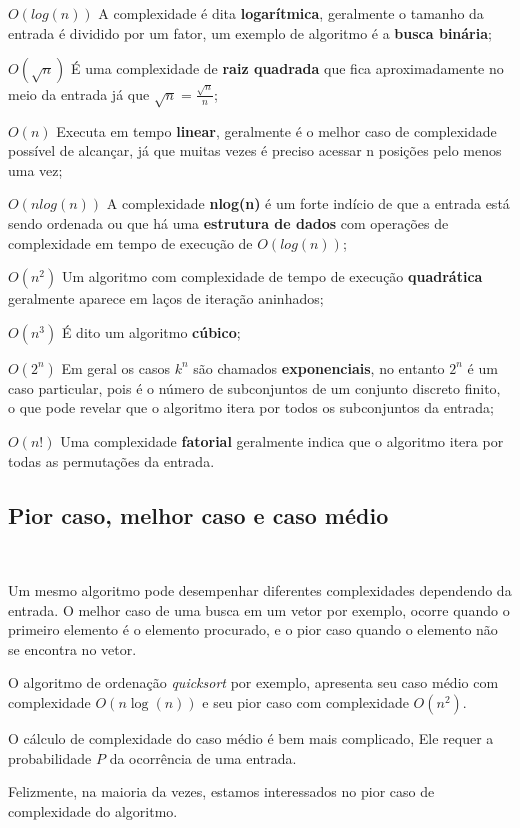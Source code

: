 $O(log(n))$ A complexidade é dita \textbf{logarítmica}, geralmente o tamanho da entrada é dividido por um fator, um exemplo de algoritmo é a \textbf{busca binária};

$O(\sqrt{n})$ É uma complexidade de \textbf{raiz quadrada} que fica aproximadamente no meio da entrada já que $\sqrt{n} = \frac{\sqrt{n}}{n}$;

$O(n)$ Executa em tempo \textbf{linear}, geralmente é o melhor caso de complexidade possível de alcançar, já que muitas vezes é preciso acessar n posições pelo menos uma vez;

$O(nlog(n))$ A complexidade \textbf{nlog(n)} é um forte indício de que a entrada está sendo ordenada ou que há uma \textbf{estrutura de dados} com operações de complexidade em tempo de execução de $O(log(n))$;

$O(n^2)$ Um algoritmo com complexidade de tempo de execução \textbf{quadrática} geralmente aparece em laços de iteração aninhados; 

$O(n^3)$ É dito um algoritmo \textbf{cúbico};

$O(2^n)$ Em geral os casos $k^n$ são chamados \textbf{exponenciais}, no entanto $2^n$ é um caso particular, pois é o número de subconjuntos de um conjunto discreto finito, o que pode revelar que o algoritmo itera por todos os subconjuntos da entrada;

$O(n!)$ Uma complexidade \textbf{fatorial} geralmente indica que o algoritmo itera por todas as permutações da entrada.

\subsection{Pior caso, melhor caso e caso médio}
\

Um mesmo algoritmo pode desempenhar diferentes complexidades dependendo da entrada. O melhor caso de uma busca em um vetor por exemplo, ocorre quando o primeiro elemento é o elemento procurado, e o pior caso quando o elemento não se encontra no vetor.

O algoritmo de ordenação \textit{quicksort} por exemplo, apresenta seu caso médio com complexidade $O(n\log(n))$ e seu pior caso com complexidade $O(n^2)$.

O cálculo de complexidade do caso médio é bem mais complicado, Ele requer a probabilidade $P$ da ocorrência de uma entrada.

Felizmente, na maioria da vezes, estamos interessados no pior caso de complexidade do algoritmo.